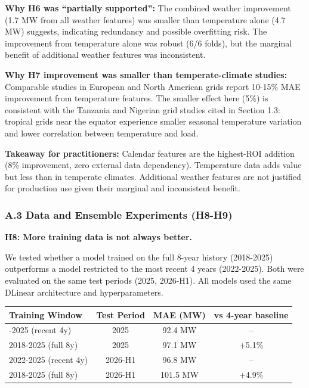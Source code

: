 \textbf{Why H6 was ``partially supported'':} The combined weather
improvement (1.7 MW from all weather features) was smaller than
temperature alone (4.7 MW) suggests, indicating redundancy and possible
overfitting risk. The improvement from temperature alone was robust (6/6
folds), but the marginal benefit of additional weather features was
inconsistent.

\textbf{Why H7 improvement was smaller than temperate-climate studies:}
Comparable studies in European and North American grids report 10-15\%
MAE improvement from temperature features. The smaller effect here (5\%)
is consistent with the Tanzania and Nigerian grid studies cited in
Section 1.3: tropical grids near the equator experience smaller seasonal
temperature variation and lower correlation between temperature and
load.

\textbf{Takeaway for practitioners:} Calendar features are the
highest-ROI addition (8\% improvement, zero external data dependency).
Temperature data adds value but less than in temperate climates.
Additional weather features are not justified for production use given
their marginal and inconsistent benefit.

\subsubsection{A.3 Data and Ensemble Experiments
(H8-H9)}\label{a.3-data-and-ensemble-experiments-h8-h9}

\textbf{H8: More training data is not always better.}

We tested whether a model trained on the full 8-year history (2018-2025)
outperforms a model restricted to the most recent 4 years (2022-2025).
Both were evaluated on the same test periods (2025, 2026-H1). All models
used the same DLinear architecture and hyperparameters.

{\def\LTcaptype{none} %
\begin{longtable}[]{@{}lccc@{}}
\toprule\noalign{}
Training Window & Test Period & MAE (MW) & vs 4-year baseline \\
\midrule\noalign{}
\endhead
\bottomrule\noalign{}
\endlastfoot
2022-2025 (recent 4y) & 2025 & 92.4 MW & -- \\
2018-2025 (full 8y) & 2025 & 97.1 MW & +5.1\% \\
2022-2025 (recent 4y) & 2026-H1 & 96.8 MW & -- \\
2018-2025 (full 8y) & 2026-H1 & 101.5 MW & +4.9\% \\
\end{longtable}
}

